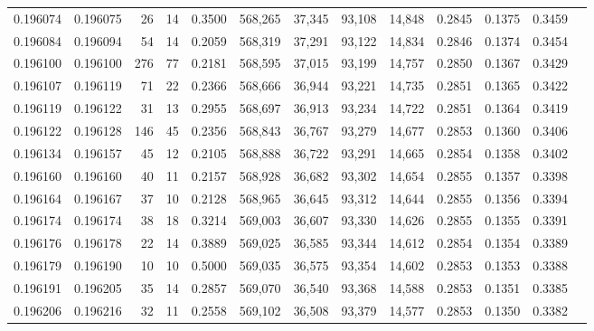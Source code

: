 \begin{tabular}{rrrrrrrrrrrrr}
0.196074 & 0.196075 &    26 &  14 &                                     0.3500 & 568,265 &  37,345 &  93,108 &  14,848 & 0.2845 & 0.1375 & 0.3459 \\
0.196084 & 0.196094 &    54 &  14 &                                     0.2059 & 568,319 &  37,291 &  93,122 &  14,834 & 0.2846 & 0.1374 & 0.3454 \\
0.196100 & 0.196100 &   276 &  77 &                                     0.2181 & 568,595 &  37,015 &  93,199 &  14,757 & 0.2850 & 0.1367 & 0.3429 \\
0.196107 & 0.196119 &    71 &  22 &                                     0.2366 & 568,666 &  36,944 &  93,221 &  14,735 & 0.2851 & 0.1365 & 0.3422 \\
0.196119 & 0.196122 &    31 &  13 &                                     0.2955 & 568,697 &  36,913 &  93,234 &  14,722 & 0.2851 & 0.1364 & 0.3419 \\
0.196122 & 0.196128 &   146 &  45 &                                     0.2356 & 568,843 &  36,767 &  93,279 &  14,677 & 0.2853 & 0.1360 & 0.3406 \\
0.196134 & 0.196157 &    45 &  12 &                                     0.2105 & 568,888 &  36,722 &  93,291 &  14,665 & 0.2854 & 0.1358 & 0.3402 \\
0.196160 & 0.196160 &    40 &  11 &                                     0.2157 & 568,928 &  36,682 &  93,302 &  14,654 & 0.2855 & 0.1357 & 0.3398 \\
0.196164 & 0.196167 &    37 &  10 &                                     0.2128 & 568,965 &  36,645 &  93,312 &  14,644 & 0.2855 & 0.1356 & 0.3394 \\
0.196174 & 0.196174 &    38 &  18 &                                     0.3214 & 569,003 &  36,607 &  93,330 &  14,626 & 0.2855 & 0.1355 & 0.3391 \\
0.196176 & 0.196178 &    22 &  14 &                                     0.3889 & 569,025 &  36,585 &  93,344 &  14,612 & 0.2854 & 0.1354 & 0.3389 \\
0.196179 & 0.196190 &    10 &  10 &                                     0.5000 & 569,035 &  36,575 &  93,354 &  14,602 & 0.2853 & 0.1353 & 0.3388 \\
0.196191 & 0.196205 &    35 &  14 &                                     0.2857 & 569,070 &  36,540 &  93,368 &  14,588 & 0.2853 & 0.1351 & 0.3385 \\
0.196206 & 0.196216 &    32 &  11 &                                     0.2558 & 569,102 &  36,508 &  93,379 &  14,577 & 0.2853 & 0.1350 & 0.3382 \\

\end{tabular}
